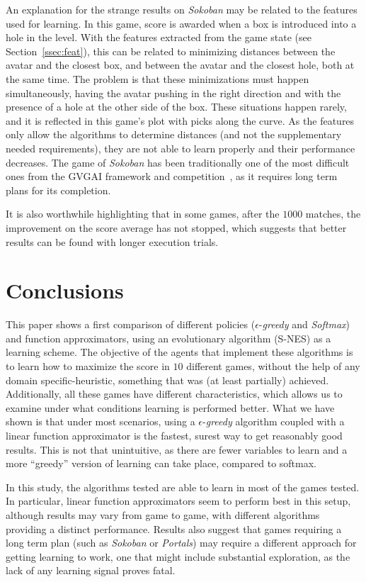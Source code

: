 \documentclass[conference]{IEEEtran}
\begin{document}
An explanation for the strange results on \textit{Sokoban} may be related to the features used for learning. In this game, score is awarded when a box is introduced into a hole in the level. With the features extracted from the game state (see Section~\ref{ssec:feat}), this can be related to minimizing distances between the avatar and the closest box, and between the avatar and the closest hole, both at the same time. The problem is that these minimizations must happen simultaneously, having the avatar pushing in the right direction and with the presence of a hole at the other side of the box. These situations happen rarely, and it is reflected in this game's plot with picks along the curve. As the features only allow the algorithms to determine distances (and not the supplementary needed requirements), they are not able to learn properly and their performance decreases. The game of \textit{Sokoban} has been traditionally one of the most difficult ones from the GVGAI framework and competition~\cite{Perez2015}, as it requires long term plans for its completion.

It is also worthwhile highlighting that in some games, after the $1000$ matches, the improvement on the score average has not stopped, which suggests that better results can be found with longer execution trials.


\section{Conclusions} \label{sec:conc}

This paper shows a first comparison of different policies ($\epsilon$-\textit{greedy} and \textit{Softmax}) and function approximators, using an evolutionary algorithm (S-NES) as a learning scheme. The objective of the agents that implement these algorithms is to learn how to maximize the score in $10$ different games, without the help of any domain specific-heuristic, something that was (at least partially) achieved. Additionally, all these games have different characteristics, which allows us to examine under what conditions learning is performed better. What we have shown is that under most scenarios, using a $\epsilon$-\textit{greedy} algorithm coupled with a linear function approximator is the fastest, surest way to get reasonably good results. This is not that unintuitive, as there are fewer variables to learn and a more ``greedy'' version of learning can take place, compared to softmax. 

In this study, the algorithms tested are able to learn in most of the games tested. In particular, linear function approximators seem to perform best in this setup, although results may vary from game to game, with different algorithms providing a distinct performance. Results also suggest that games requiring a long term plan (such as \textit{Sokoban} or \textit{Portals}) may require a different approach for getting learning to work, one that might include substantial exploration, as the lack of any learning signal proves fatal. 
\end{document}
